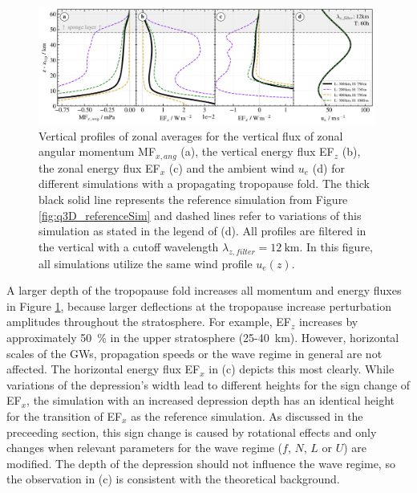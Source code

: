 \begin{figure}[t]
    \centering
    \includegraphics[width=0.99\textwidth]{figures_q3D/TD-zprofiles-translbq3D_shape-T60h-avg.png}
    \caption{Vertical profiles of zonal averages for the vertical flux of zonal angular momentum MF$_{x,ang}$ (a), the vertical energy flux EF$_z$ (b), the zonal energy flux EF$_x$ (c) and the ambient wind $u_e$ (d) for different simulations with a propagating tropopause fold. The thick black solid line represents the reference simulation from Figure \ref{fig:q3D_referenceSim} and dashed lines refer to variations of this simulation as stated in the legend of (d). All profiles are filtered in the vertical with a cutoff wavelength $\lambda_{z,filter}=\SI{12}{\kilo\meter}$. In this figure, all simulations utilize the same wind profile $u_e(z)$.}
    \label{fig:q3D_shape}
\end{figure}
A larger depth of the tropopause fold increases all momentum and energy fluxes in Figure \ref{fig:q3D_shape}, because larger deflections at the tropopause increase perturbation amplitudes throughout the stratosphere. For example, EF$_z$ increases by approximately \SI{50}{\percent} in the upper stratosphere (25-\SI{40}{\kilo\meter}). However, horizontal scales of the GWs, propagation speeds or the wave regime in general are not affected. The horizontal energy flux EF$_x$ in (c) depicts this most clearly. While variations of the depression's width lead to different heights for the sign change of EF$_x$, the simulation with an increased depression depth has an identical height for the transition of EF$_x$ as the reference simulation. As discussed in the preceeding section, this sign change is caused by rotational effects and only changes when relevant parameters for the wave regime ($f$, $N$, $L$ or $U$) are modified. The depth of the depression should not influence the wave regime, so the observation in (c) is consistent with the theoretical background.
%
